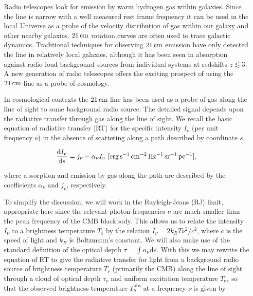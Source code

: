 \documentclass[a4paper,11pt]{article}
\begin{document}
{\noindent}Radio telescopes look for emission by warm hydrogen gas within galaxies. Since the line is narrow with a well measured rest frame frequency it can be used in the local Universe as a probe of the velocity distribution of gas within our galaxy and other nearby galaxies. $21\,{\rm cm}$ rotation curves are often used to trace galactic dynamics. Traditional techniques for observing $21\,{\rm cm}$ emission have only detected the line in relatively local galaxies, although it has been seen in absorption against radio loud background sources from individual systems at redshifts $z\lesssim3$. A new generation of radio telescopes offers the exciting prospect of using the $21\,{\rm cm}$ line as a probe of cosmology.

{\noindent}In cosmological contexts the $21\,{\rm cm}$ line has been used as a probe of gas along the line of sight to some background radio source. The detailed signal depends upon the radiative transfer through gas along the line of sight. We recall the basic equation of radiative transfer (RT) for the specific intensity $I_\nu$ (per unit frequency $\nu$) in the absence of scattering along a path described by coordinate $s$

\begin{align*}
    \frac{\mathrm{d}I_\nu}{\mathrm{d}s} = j_\nu - \alpha_\nu I_\nu ~ [{\rm erg\,s^{-1}\,cm^{-2}\,Hz^{-1}\,sr^{-1}\,pc^{-1}}],
\end{align*}

{\noindent}where absorption and emission by gas along the path are described by the coefficients $\alpha_\nu$ and $j_\nu$, respectively.

{\noindent}To simplify the discussion, we will work in the Rayleigh-Jeans (RJ) limit, appropriate here since the relevant photon frequencies $\nu$ are much smaller than the peak frequency of the CMB blackbody. This allows us to relate the intensity $I_\nu$ to a brightness temperature $T_b$ by the relation $I_\nu=2k_BT\nu^2/c^2$, where $c$ is the speed of light and $k_B$ is Boltzmann's constant. We will also make use of the standard definition of the optical depth $\tau=\int\alpha_\nu\mathrm{d}s$. With this we may rewrite the equation of RT to give the radiative transfer for light from a background radio source of brightness temperature $T_r$ (primarily the CMB) along the line of sight through a cloud of optical depth $\tau_\nu$ and uniform excitation temperature $T_\mathrm{ex}$ so that the observed brightness temperature $T_b^\mathrm{obs}$ at a frequency $\nu$ is given by
\end{document}
